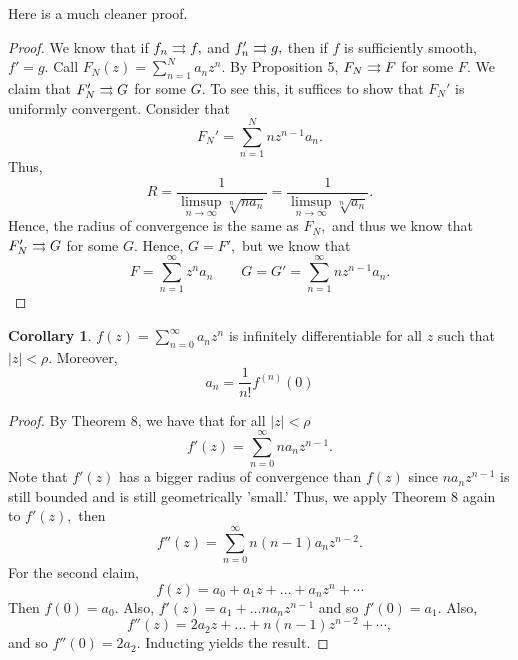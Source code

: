 \documentclass[10pt, oneside]{article}
\theoremstyle{definition}
\newtheorem{cor}{Corollary}
\begin{document}
Here is a much cleaner proof.
\begin{proof}
    We know that if $f_n \overset{}{\rightrightarrows} f,$ and $f_n' \overset{}{\rightrightarrows} g,$ then if $f$ is sufficiently smooth, $f' = g.$ Call $F_N(z) = \sum_{n=1}^N a_nz^n.$ By Proposition 5, $F_N \overset{}{\rightrightarrows} F$ for some $F.$ We claim that $F_N' \overset{}{\rightrightarrows} G$ for some $G.$  To see this, it suffices to show that $F_N'$ is uniformly convergent. Consider that 
    \[F_N' = \sum_{n=1}^N nz^{n-1}a_n.\] Thus, 
    \[R = \frac{1}{\limsup_{n\to \infty} \sqrt[n]{n a_n}} = \frac{1}{\limsup_{n\to \infty} \sqrt[n]{a_n}}.\] Hence, the radius of convergence is the same as $F_N,$ and thus we know that $F_N' \overset{}{\rightrightarrows} G$ for some $G.$ Hence, $G = F',$ but we know that 
    \[F = \sum_{n=1}^\infty z^na_n \qquad G = G' = \sum_{n=1}^\infty nz^{n-1} a_n.\]
\end{proof}

\begin{cor}
    $f(z) = \sum_{n=0}^\infty a_n z^n$ is infinitely differentiable for all $z$ such that $|z| < \rho.$ Moreover, 
    \[a_n = \frac{1}{n!}f^{(n)}(0)\]
\end{cor}
\begin{proof}
    By Theorem 8, we have that for all $|z| < \rho$
    \[f'(z) = \sum_{n=0}^\infty n a_n z^{n-1}.\] Note that $f'(z)$ has a bigger radius of convergence than $f(z)$ since $na_n z^{n-1}$ is still bounded and is still geometrically 'small.' Thus, we apply Theorem 8 again to $f'(z),$ then 
    \[f''(z) = \sum_{n=0}^\infty n(n-1)a_n z^{n-2}.\] For the second claim, 
    \[f(z) = a_0 + a_1z + \dots +  a_nz^n + \cdots\] Then $f(0) = a_0.$ Also, $f'(z) = a_1 
 + \dots na_n z^{n-1}$ and so $f'(0) = a_1.$ Also, 
 \[f''(z) = 2a_2z + \dots  + n(n-1)z^{n-2} + \cdots,\] and so $f''(0) = 2a_2.$ Inducting yields the result.
\end{proof}

\newpage
\end{document}
